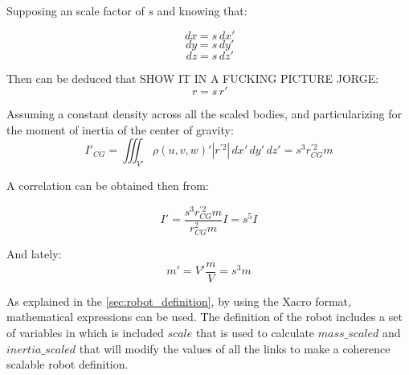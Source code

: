 Supposing an scale factor of $s$ and knowing that:

\begin{multicols}{3}
  \begin{equation}
    \,dx=s \,dx'
  \end{equation}\break
  \begin{equation}
    \,dy=s \,dy'
  \end{equation}\break
  \begin{equation}
    \,dz=s \,dz'
  \end{equation}\break
\end{multicols}

Then can be deduced that SHOW IT IN A FUCKING PICTURE JORGE:
\begin{equation}
  \,r=s \,r'
\end{equation}

Assuming a constant density across all the scaled bodies, and particularizing for the moment of inertia of the center of gravity:
\begin{equation}
  I'_{CG} = \iiint_{V'} \rho(u,v,w)' |r^{'2}| \,dx'\,dy'\,dz' = s^{3} r_{CG}^{'2} m
\end{equation}

A correlation can be obtained then from:

\begin{equation}
\label{eq:inertia_scale}
  I' = \frac{s^{3} r_{CG}^{'2} m}{r_{CG}^{2} m} I = s^{5} I
\end{equation}

And lately:
\begin{equation}
\label{eq:mass_scale}
  m' = V' \frac{m}{V} = s^{3}m
\end{equation}

As explained in the \ref{sec:robot_definition}, by using the Xacro format, mathematical expressions can be used.
The definition of the robot includes a set of variables in which is included $scale$ that is used to calculate $mass\_scaled$ and $inertia\_scaled$ that will modify the values of all the links to make a coherence scalable robot definition.

